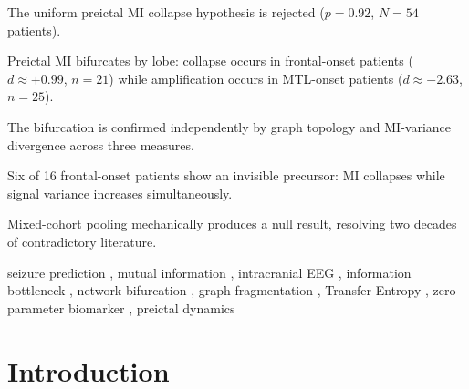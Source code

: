 \documentclass[a4paper,fleqn]{cas-dc}
\begin{document}
\begin{highlights}
  \item The uniform preictal MI collapse hypothesis is rejected
        ($p = 0.92$, $N = 54$ patients).
  \item Preictal MI bifurcates by lobe: collapse occurs in
        frontal-onset patients ($d \approx +0.99$, $n = 21$) while
        amplification occurs in MTL-onset patients ($d \approx -2.63$,
        $n = 25$).
  \item The bifurcation is confirmed independently by graph topology
        and MI-variance divergence across three measures.
  \item Six of 16 frontal-onset patients show an invisible precursor:
        MI collapses while signal variance increases simultaneously.
  \item Mixed-cohort pooling mechanically produces a null result,
        resolving two decades of contradictory literature.
\end{highlights}

\begin{keywords}
seizure prediction \sep
mutual information \sep
intracranial EEG \sep
information bottleneck \sep
network bifurcation \sep
graph fragmentation \sep
Transfer Entropy \sep
zero-parameter biomarker \sep
preictal dynamics
\end{keywords}

\maketitle

\section{Introduction}
\label{sec:intro}
\end{document}
